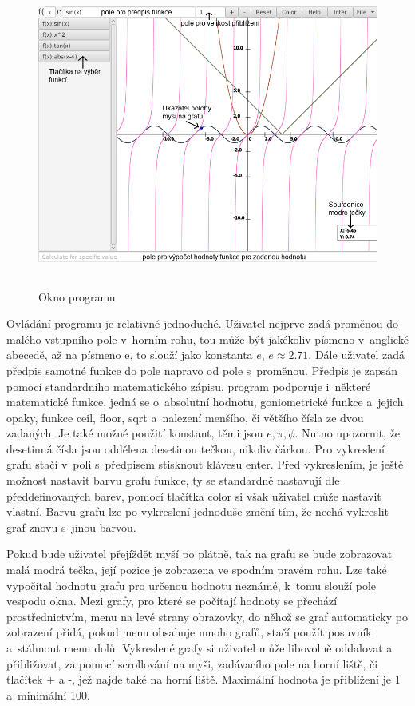 \documentclass[a4paper,oneside,12p]{report}
\begin{document}
\begin{figure}[h]
	\centering
		\includegraphics[height=10cm]{../img/layout.png}
	\caption{Okno programu}
\end{figure}
Ovládání programu je relativně jednoduché.
Uživatel nejprve zadá proměnou do malého vstupního pole v~horním rohu, tou může být jakékoliv písmeno v~anglické abecedě, až na písmeno e, to slouží jako konstanta $e$, $e \approx 2.71$.
Dále uživatel zadá předpis samotné funkce do pole napravo od pole s~proměnou.
Předpis je zapsán pomocí standardního matematického zápisu, program podporuje i~některé matematické funkce, jedná se o~absolutní hodnotu, goniometrické funkce a~jejich opaky, funkce ceil, floor, sqrt a~nalezení menšího, či většího čísla ze dvou zadaných.
Je také možné použití konstant, těmi jsou $e, \pi, \phi$.
Nutno upozornit, že desetinná čísla jsou oddělena desetinou tečkou, nikoliv čárkou.
Pro vykreslení grafu stačí v~poli s~předpisem stisknout klávesu enter.
Před vykreslením, je ještě možnost nastavit barvu grafu funkce, ty se standardně nastavují dle předdefinovaných barev, pomocí tlačítka color si však uživatel může nastavit vlastní.
Barvu grafu lze po vykreslení jednoduše změní tím, že nechá vykreslit graf znovu s~jinou barvou.

Pokud bude uživatel přejíždět myší po plátně, tak na grafu se bude zobrazovat malá modrá tečka, její pozice je zobrazena ve spodním pravém rohu.
Lze také vypočítal hodnotu grafu pro určenou hodnotu neznámé, k~tomu slouží pole vespodu okna.
Mezi grafy, pro které se počítají hodnoty se přechází prostřednictvím, menu na levé strany obrazovky, do něhož se graf automaticky po zobrazení přidá, pokud menu obsahuje mnoho grafů, stačí použít posuvník a~stáhnout menu dolů.
Vykreslené grafy si uživatel může libovolně oddalovat a přibližovat, za pomocí scrollování na myši, zadávacího pole na horní liště, či tlačítek + a -, jež najde také na horní liště.
Maximální hodnota je přiblížení je 1 a~minimální 100.
\end{document}
